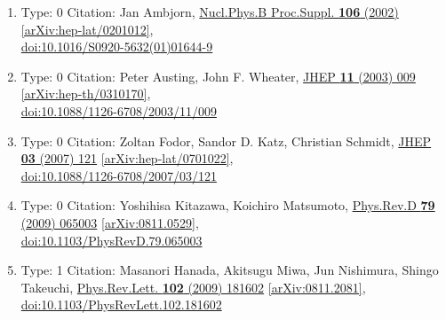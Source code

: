 \documentclass[a4paper,10pt]{article}
\begin{document}
\begin{enumerate}
\begin{enumerate}
  \item Type: 0 Citation: Jan Ambjorn, \href{https://www.doi.org/10.1016/S0920-5632(01)01644-9}{Nucl.Phys.B Proc.Suppl. {\bf 106} (2002) }  \href{https://arxiv.org/abs/hep-lat/0201012}{[arXiv:hep-lat/0201012]},\\\href{https://www.doi.org/10.1016/S0920-5632(01)01644-9}{doi:10.1016/S0920-5632(01)01644-9}
  \item Type: 0 Citation: Peter Austing, John F. Wheater, \href{https://www.doi.org/10.1088/1126-6708/2003/11/009}{JHEP {\bf 11} (2003) 009}  \href{https://arxiv.org/abs/hep-th/0310170}{[arXiv:hep-th/0310170]},\\\href{https://www.doi.org/10.1088/1126-6708/2003/11/009}{doi:10.1088/1126-6708/2003/11/009}
  \item Type: 0 Citation: Zoltan Fodor, Sandor D. Katz, Christian Schmidt, \href{https://www.doi.org/10.1088/1126-6708/2007/03/121}{JHEP {\bf 03} (2007) 121}  \href{https://arxiv.org/abs/hep-lat/0701022}{[arXiv:hep-lat/0701022]},\\\href{https://www.doi.org/10.1088/1126-6708/2007/03/121}{doi:10.1088/1126-6708/2007/03/121}
  \item Type: 0 Citation: Yoshihisa Kitazawa, Koichiro Matsumoto, \href{https://www.doi.org/10.1103/PhysRevD.79.065003}{Phys.Rev.D {\bf 79} (2009) 065003}  \href{https://arxiv.org/abs/0811.0529}{[arXiv:0811.0529]},\\\href{https://www.doi.org/10.1103/PhysRevD.79.065003}{doi:10.1103/PhysRevD.79.065003}
  \item Type: 1 Citation: Masanori Hanada, Akitsugu Miwa, Jun Nishimura, Shingo Takeuchi, \href{https://www.doi.org/10.1103/PhysRevLett.102.181602}{Phys.Rev.Lett. {\bf 102} (2009) 181602}  \href{https://arxiv.org/abs/0811.2081}{[arXiv:0811.2081]},\\\href{https://www.doi.org/10.1103/PhysRevLett.102.181602}{doi:10.1103/PhysRevLett.102.181602}

\end{enumerate}
\end{enumerate}
\end{document}
